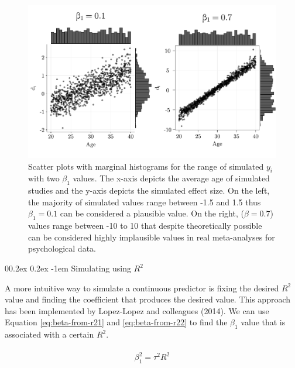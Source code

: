 \documentclass[
  man,floatsintext]{apa6}
\makeatletter
\let\oldparagraph\paragraph
\renewcommand{\paragraph}[1]{\oldparagraph{#1}\mbox{}}
\renewcommand{\paragraph}{\@startsection{paragraph}{4}{\parindent}%
  {0\baselineskip \@plus 0.2ex \@minus 0.2ex}%
  {-1em}%
  {\normalfont\normalsize\bfseries\itshape\typesectitle}}
\makeatother
\begin{document}
\normalsize

\scriptsize

\begin{figure}[H]

{\centering \includegraphics[width=0.8\linewidth]{paper_files/figure-latex/plot-meta-reg-plausible-implausible-1} 

}

\caption{Scatter plots with marginal histograms for the range of simulated \(y_i\) with two \(\beta_1\) values. The x-axis depicts the average age of simulated studies and the y-axis depicts the simulated effect size. On the left, the majority of simulated values range between -1.5 and 1.5 thus \(\beta_1 = 0.1\) can be considered a plausible value. On the right, (\(\beta = 0.7\)) values range between -10 to 10 that despite theoretically possible can be considered highly implausible values in real meta-analyses for psychological data.}\label{fig:plot-meta-reg-plausible-implausible}
\end{figure}

\normalsize

\hypertarget{simulating-using-r2}{%
\paragraph{\texorpdfstring{Simulating using \(R^2\)}{Simulating using R\^{}2}}\label{simulating-using-r2}}

A more intuitive way to simulate a continuous predictor is fixing the desired \(R^{2}\) value and finding the coefficient that produces the desired value. This approach has been implemented by Lopez-Lopez and colleagues (2014). We can use Equation \eqref{eq:beta-from-r21} and \eqref{eq:beta-from-r22} to find the \(\beta_{1}\) value that is associated with a certain \(R^{2}\).

\begin{align}
\begin{aligned}
\beta^2_1 = \tau^2R^2
\label{eq:beta-from-r21}
\end{aligned}
\end{align}
\end{document}
